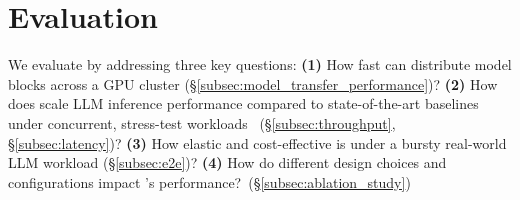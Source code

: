 \section{Evaluation}
\label{sec:evaluation}
We evaluate \SysName by addressing three key questions:  
{\bf (1)} How fast can \SysName distribute model blocks across a GPU cluster (\S\ref{subsec:model_transfer_performance})?
{\bf (2)} How does \SysName scale LLM inference performance compared to state-of-the-art baselines under concurrent, stress-test workloads ~(\S\ref{subsec:throughput}, \S\ref{subsec:latency})? 
{\bf (3)} How elastic and cost-effective is \SysName under a bursty real-world LLM workload (\S\ref{subsec:e2e})?
{\bf (4)} How do different design choices and configurations impact \SysName's performance?~(\S\ref{subsec:ablation_study}) 
%

